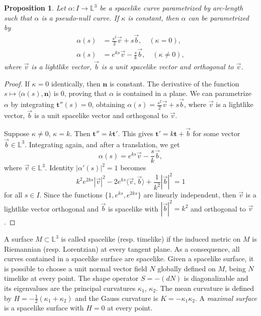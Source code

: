 \documentclass[a4paper,12pt]{amsart}
\numberwithin{equation}{section}
\newtheorem{proposition}[theorem]{Proposition}
\theoremstyle{definition}
\def\rr{\mathbb L}
\def\t{\mathbf t}
\def\n{\mathbf n}
\begin{document}
\begin{proposition}\label{pr1} Let $\alpha\colon I\to\rr^3$ be a spacelike curve parametrized by arc-length such that $\alpha$ is a pseudo-null curve. If $\kappa$ is constant, then $\alpha$ can be parametrized by
\begin{equation}\label{pr11}
\begin{split}
\alpha(s)&=\frac{s^2}{2}\vec{v}+s\vec{b},\quad (\kappa=0),\\
\alpha(s)&=e^{ks}\vec{v}-\frac{s}{k}\vec{b},\quad (\kappa\not=0),
\end{split}
\end{equation}
where $\vec{v}$ is a lightlike vector, $\vec{b}$ is a unit spacelike vector and orthogonal to $\vec{v}$.
\end{proposition}

\begin{proof}
If $\kappa=0$ identically, then $\n$ is constant. The derivative of  the function $s\mapsto \langle\alpha(s),\n\rangle$ is $0$, proving that $\alpha$ is contained in a plane. We can parametrize $\alpha$ by integrating $\t''(s)=0$, obtaining $\alpha(s)=\frac{s^2}{2}\vec{v}+s\vec{b}$, where $\vec{v}$ is a lightlike vector, $\vec{b}$ is a unit spacelike vector and orthogonal to $\vec{v}$.

Suppose $\kappa\not=0$, $\kappa=k$.   Then $\t''=k\t'$. This gives $\t'=k\t+\vec{b}$ for some   vector $\vec{b}\in\rr^3$.  Integrating again, and after a translation, we  get 
$$\alpha(s)=e^{ks}\vec{v}-\frac{s}{k}\vec{b},$$
where $\vec{v}\in\rr^3$. 
Identity $|\alpha'(s)|^2=1$ becomes
$$k^2e^{2ks}|\vec{v}|^2-2e^{ks}\langle\vec{v},\vec{b}\rangle+\frac{1}{k^2}|\vec{b}|^2=1$$
for all $s\in I$. Since the functions $\{1,e^{ks}, e^{2ks}\}$ are linearly independent, then $\vec{v}$ is a lightlike vector orthogonal and $\vec{b}$ is spacelike with $|\vec{b}|^2=k^2$ and orthogonal to $\vec{v}$.
\end{proof}

A surface $M\subset\rr^3$ is called spacelike (resp. timelike) if the induced metric on $M$ is Riemannian (resp. Lorentzian) at every tangent plane. As a consequence, all curves contained in a spacelike surface are spacelike. Given a spacelike surface, it is  possible to choose a unit normal vector field $N$  globally defined on  $M$, being $N$ timelike at every point.  The  shape operator $S=-(dN)$  is diagonalizable and its eigenvalues are the principal curvatures $\kappa_1$, $\kappa_2$. The mean curvature is defined by $H=-\frac12(\kappa_1+\kappa_2)$ and the Gauss curvature is $K=-\kappa_1\kappa_2$. A {\it maximal surface} is a spacelike surface with $H=0$ at every point. 
 
\end{document}
